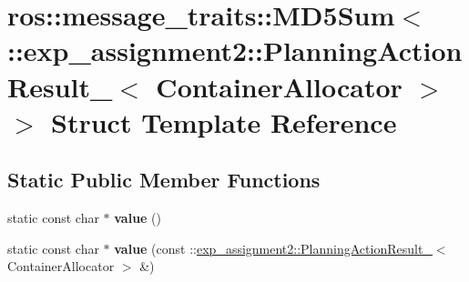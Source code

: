 \hypertarget{structros_1_1message__traits_1_1MD5Sum_3_01_1_1exp__assignment2_1_1PlanningActionResult___3_01ContainerAllocator_01_4_01_4}{}\section{ros\+:\+:message\+\_\+traits\+:\+:M\+D5\+Sum$<$ \+:\+:exp\+\_\+assignment2\+:\+:Planning\+Action\+Result\+\_\+$<$ Container\+Allocator $>$ $>$ Struct Template Reference}
\label{structros_1_1message__traits_1_1MD5Sum_3_01_1_1exp__assignment2_1_1PlanningActionResult___3_01ContainerAllocator_01_4_01_4}
\subsection*{Static Public Member Functions}
\begin{DoxyCompactItemize}
\item 
\mbox{\label{structros_1_1message__traits_1_1MD5Sum_3_01_1_1exp__assignment2_1_1PlanningActionResult___3_01ContainerAllocator_01_4_01_4_a391f7901c74e6bdf6017b64deb45e165}} 
static const char $\ast$ {\bfseries value} ()
\item 
\mbox{\label{structros_1_1message__traits_1_1MD5Sum_3_01_1_1exp__assignment2_1_1PlanningActionResult___3_01ContainerAllocator_01_4_01_4_ad32247f4297261732e735167d282cc3f}} 
static const char $\ast$ {\bfseries value} (const \+::\hyperlink{structexp__assignment2_1_1PlanningActionResult__}{exp\+\_\+assignment2\+::\+Planning\+Action\+Result\+\_\+}$<$ Container\+Allocator $>$ \&)
\end{DoxyCompactItemize}
